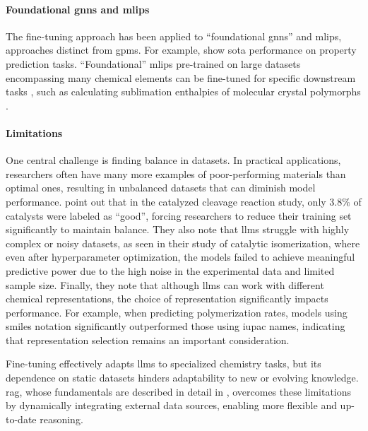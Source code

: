 \paragraph{Foundational \glspl{gnn} and \glspl{mlip}} The fine-tuning approach has been applied to \enquote{foundational \glspl{gnn}} \autocite{sypetkowski2024scalability, shoghi2023molecules} and \glspl{mlip}, approaches distinct from \glspl{gpm}. For example, \textcite{shoghi2023molecules, sypetkowski2024scalability} show \gls{sota} performance on property prediction tasks.
\enquote{Foundational} \glspl{mlip} pre-trained on large datasets encompassing many chemical elements can be fine-tuned for specific downstream tasks \autocite{batatia2022mace}, such as calculating sublimation enthalpies of molecular crystal polymorphs \autocite{kaur2025data}.

\paragraph{Limitations} One central challenge is finding balance in datasets. In practical applications, researchers often have many more examples of poor-performing materials than optimal ones, resulting in unbalanced datasets that can diminish model performance. \textcite{vanherck2025assessment} point out that in the catalyzed cleavage reaction study, only $3.8\%$ of catalysts were labeled as \enquote{good}, forcing researchers to reduce their training set significantly to maintain balance. They also note that \glspl{llm} struggle with highly complex or noisy datasets, as seen in their study of catalytic isomerization, where even after hyperparameter optimization, the models failed to achieve meaningful predictive power due to the high noise in the experimental data and limited sample size. Finally, they note that although \glspl{llm} can work with different chemical representations, the choice of representation significantly impacts performance. For example, when predicting polymerization rates, models using \gls{smiles} notation significantly outperformed those using \gls{iupac} names, indicating that representation selection remains an important consideration.

Fine-tuning effectively adapts \glspl{llm} to specialized chemistry tasks, but its dependence on static datasets hinders adaptability to new or evolving knowledge. \gls{rag}, whose fundamentals are described in detail in , overcomes these limitations by dynamically integrating external data sources, enabling more flexible and up-to-date reasoning.

